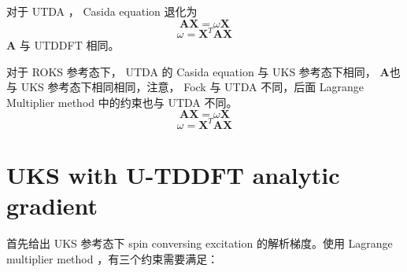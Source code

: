 \documentclass[11pt]{ctexart}
\numberwithin{equation}{section}
\begin{document}
对于 UTDA ， Casida equation 退化为
\begin{equation}
    \mathbf{A} \mathbf{X} = \omega \mathbf{X}
\end{equation}
\begin{equation}
    \omega = \mathbf{X}^{T} \mathbf{A} \mathbf{X}
\end{equation}
$\mathbf{A}$ 与 UTDDFT 相同。

对于 ROKS 参考态下， UTDA 的 Casida equation 与 UKS 参考态下相同， $\mathbf{A}$也与 UKS 参考态下相同相同，注意， Fock 与 UTDA 不同，后面 Lagrange Multiplier method 中的约束也与 UTDA 不同。
\begin{equation}
    \mathbf{A}\mathbf{X} = \omega \mathbf{X}
\end{equation}
\begin{equation}
    \omega = \mathbf{X}^{T} \mathbf{A} \mathbf{X}
\end{equation}

\section{UKS with U-TDDFT analytic gradient}
首先给出 UKS 参考态下 spin conversing excitation 的解析梯度。使用 Lagrange multiplier method ，有三个约束需要满足：
\end{document}
